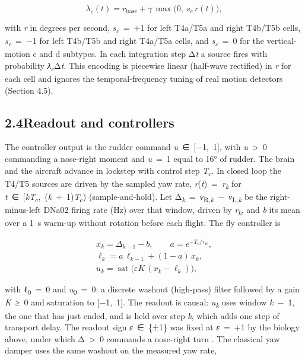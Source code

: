 \documentclass[11pt,letterpaper]{article}
\begin{document}
\[\lambda_c(t)=r_{\mathrm{base}}+\gamma\,\max\bigl(0,\ s_c\,r(t)\bigr),\tag{4}\]

\noindent with \emph{r} in degrees per second,
\emph{s\textsubscript{c}}~=~+1 for left T4a/T5a and right T4b/T5b cells,
\emph{s\textsubscript{c}}~=~−1 for left T4b/T5b and right T4a/T5a cells,
and \emph{s\textsubscript{c}}~=~0 for the vertical-motion c and d
subtypes. In each integration step Δ\emph{t} a source fires with
probability \emph{λ\textsubscript{c}}Δ\emph{t}. This encoding is
piecewise linear (half-wave rectified) in \emph{r} for each cell and
ignores the temporal-frequency tuning of real motion detectors (Section
4.5).

\subsection{\texorpdfstring{2.4\quad Readout and
controllers}{2.4Readout and controllers}}\label{readout-and-controllers}

\noindent The controller output is the rudder command
\emph{u}~∈~{[}−1,~1{]}, with \emph{u}~\textgreater~0 commanding a
nose-right moment and \textbar{}\emph{u}\textbar~=~1 equal to 16° of
rudder. The brain and the aircraft advance in lockstep with control step
\emph{T}\textsubscript{c}. In closed loop the T4/T5 sources are driven
by the sampled yaw rate, \emph{r}(\emph{t})~=~\emph{r\textsubscript{k}}
for
\emph{t}~∈~{[}\emph{kT}\textsubscript{c},~(\emph{k}~+~1)\emph{T}\textsubscript{c})
(sample-and-hold). Let
Δ\textsubscript{\emph{k}}~=~\emph{ν}\textsubscript{R,\emph{k}}~−~\emph{ν}\textsubscript{L,\emph{k}}
be the right-minus-left DNa02 firing rate (Hz) over that window, driven
by \emph{r\textsubscript{k}}, and \emph{b} its mean over a 1~s warm-up
without rotation before each flight. The fly controller is

\[\begin{gathered}x_k=\Delta_{k-1}-b,\qquad a=e^{-T_c/\tau_w},\\ \ell_k=a\,\ell_{k-1}+(1-a)\,x_k,\\ u_k=\operatorname{sat}\bigl(\varepsilon K\,(x_k-\ell_k)\bigr),\end{gathered}\tag{5}\]

\noindent with ℓ\textsubscript{0}~=~0 and \emph{u}\textsubscript{0}~=~0:
a discrete washout (high-pass) filter followed by a gain \emph{K}~≥~0
and saturation to {[}−1,~1{]}. The readout is causal:
\emph{u\textsubscript{k}} uses window \emph{k}~−~1, the one that has
just ended, and is held over step \emph{k}, which adds one step of
transport delay. The readout sign \emph{ε}~∈~\{±1\} was fixed at
\emph{ε}~=~+1 by the biology above, under which Δ~\textgreater~0
commands a nose-right turn \cite{haikala2013,rayshubskiy2025}. The
classical yaw damper uses the same washout on the measured yaw rate,
\end{document}
